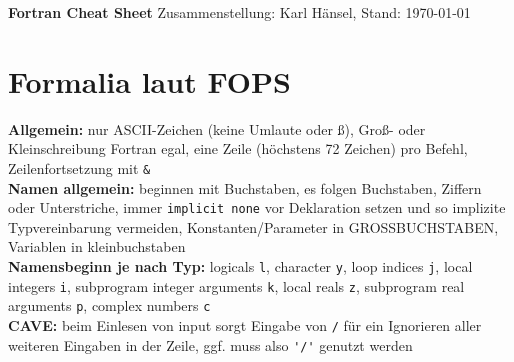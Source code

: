 \documentclass[a4paper, twocolumn]{scrarticle}
\begin{document}
  
  {\Huge \textbf{\textsf{Fortran Cheat Sheet}}}
  Zusammenstellung: Karl Hänsel, Stand: \today
  \section{Formalia laut FOPS}
  \textbf{Allgemein:} nur ASCII-Zeichen (keine Umlaute oder ß), Groß- oder Kleinschreibung Fortran egal, eine Zeile (höchstens 72 Zeichen) pro Befehl, Zeilenfortsetzung mit \lstinline|&|\\
 \textbf{ Namen allgemein:} beginnen mit Buchstaben, es folgen Buchstaben, Ziffern oder Unterstriche, immer \lstinline|implicit none| vor Deklaration setzen und so implizite Typvereinbarung vermeiden, Konstanten/Parameter in GROSSBUCHSTABEN, Variablen in kleinbuchstaben\\
 \textbf{Namensbeginn je nach Typ:} logicals \lstinline|l|, character \lstinline|y|, loop indices \lstinline|j|, local integers \lstinline|i|, subprogram integer arguments \lstinline|k|, local reals \lstinline|z|, subprogram real arguments \lstinline|p|, complex numbers \lstinline|c|\\
 \textbf{CAVE:} beim Einlesen von input sorgt Eingabe von \lstinline|/| für ein Ignorieren aller weiteren Eingaben in der Zeile, ggf. muss also \lstinline|'/'| genutzt werden
  
\end{document}
